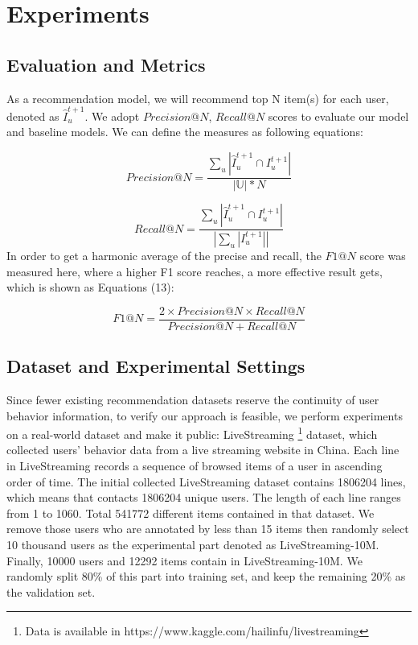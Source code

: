 \documentclass[runningheads]{llncs}
\begin{document}
\section{Experiments}

\subsection{Evaluation and Metrics}

As a recommendation model, we will recommend top N item(s) for each user, denoted as $\hat{I}_{u}^{t+1}$. We adopt $Precision@N$, $Recall@N$ scores to evaluate our model and baseline models. We can define the measures as following equations:

\begin{equation}
Precision@N=\frac{\sum_{u}|\hat{I}_{u}^{t+1}\cap I_{u}^{t+1} |}{\left | \mathbb{U} \right |*N}
\end{equation}

\begin{equation}
Recall@N=\frac{\sum_{u}|\hat{I}_{u}^{t+1}\cap I_{u}^{t+1} |}{\left |\sum_{u}|I_{u}^{t+1}| \right |}
\end{equation}
In order to get a harmonic average of the precise and recall, the $F1@N$ score was measured here, where a higher F1 score reaches, a more effective result gets, which is shown as Equations (13):

\begin{equation}
F1@N=\frac{2\times Precision@N\times Recall@N}{Precision@N+Recall@N}
\end{equation}
\subsection{Dataset and Experimental Settings}

Since fewer existing recommendation datasets reserve the continuity of user behavior information, to verify our approach is feasible, we perform experiments on a real-world dataset and make it public: LiveStreaming \footnote{Data is available in https://www.kaggle.com/hailinfu/livestreaming} dataset, which collected users' behavior data from a live streaming website in China. Each line in LiveStreaming records a sequence of browsed items of a user in ascending order of time.  The initial collected LiveStreaming dataset contains 1806204 lines, which means that contacts 1806204 unique users. The length of each line ranges from 1 to 1060. Total 541772 different items contained in that dataset. We remove those users who are annotated by less than 15 items then randomly select 10 thousand users as the experimental part denoted as LiveStreaming-10M. Finally, 10000 users and 12292 items contain in LiveStreaming-10M. We randomly split 80\% of this part into training set, and keep the remaining 20\% as the validation set.
\end{document}
